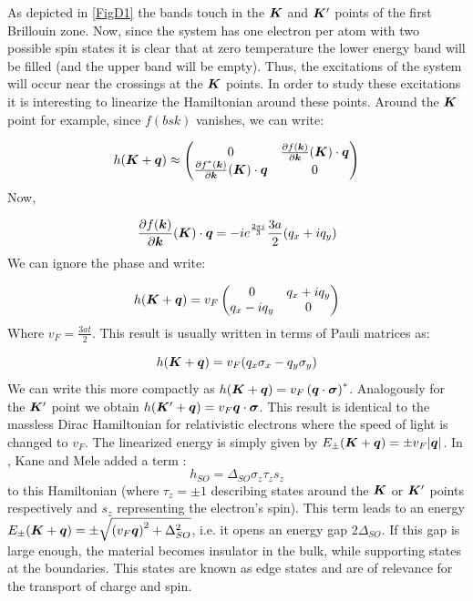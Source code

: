 As depicted in \ref{FigD1} the bands touch in the $\boldsymbol{K}$ and $\boldsymbol{K}'$ points of the first Brillouin zone. Now, since the system has one electron per atom with two possible spin states it is clear that at zero temperature the lower energy band will be filled (and the upper band will be empty). Thus, the excitations of the system will occur near the crossings at the $\boldsymbol{K}$ points. In order to study these excitations it is interesting to linearize the Hamiltonian around these points. Around the $\boldsymbol{K}$ point for example, since $f(bs{k})$ vanishes, we can write:

\begin{equation}
h(\boldsymbol{K}+\boldsymbol{q}) \approx \begin{pmatrix}
    0 & \frac{\partial f(\boldsymbol{k})}{\partial \boldsymbol{k}}(\boldsymbol{K})\cdot\boldsymbol{q} \\
    \frac{\partial f^*(\boldsymbol{k})}{\partial \boldsymbol{k}}(\boldsymbol{K})\cdot\boldsymbol{q} & 0
\end{pmatrix}
\end{equation}
Now, 

\begin{equation}
\frac{\partial f(\boldsymbol{k})}{\partial \boldsymbol{k}}(\boldsymbol{K})\cdot\boldsymbol{q} = -ie^{\frac{2\pi i}{3}} \frac{3a}{2}(q_x+iq_y)
\end{equation}
We can ignore the phase and write:

\begin{equation}
h(\boldsymbol{K}+\boldsymbol{q}) = v_F \begin{pmatrix}
    0 & q_x+iq_y \\
    q_x-iq_y & 0
\end{pmatrix}
\end{equation}
Where $v_F = \frac{3at}{2}$. This result is usually written in terms of Pauli matrices as:

\begin{equation}
h(\boldsymbol{K}+\boldsymbol{q}) = v_F(q_x\sigma_x-q_y\sigma_y)
\end{equation}
We can write this more compactly as $h(\boldsymbol{K}+\boldsymbol{q}) = v_F \left(\boldsymbol{q}\cdot\boldsymbol{\sigma}\right)^*$. Analogously for the $\boldsymbol{K}'$ point we obtain $h(\boldsymbol{K}'+\boldsymbol{q}) = v_F\boldsymbol{q}\cdot\boldsymbol{\sigma}$. This result is identical to the massless Dirac Hamiltonian for relativistic electrons where the speed of light is changed to $v_F$. The linearized energy is simply given by $E_{\pm}(\boldsymbol{K}+\boldsymbol{q}) = \pm v_F|\boldsymbol{q}|$. In \cite{Kane2005}, Kane and Mele added a term :
\begin{equation}
h_{SO} = \Delta_{SO}\sigma_z\tau_z s_z
\end{equation} 
to this Hamiltonian (where $\tau_z = \pm 1$ describing states around the $\boldsymbol{K}$ or $\boldsymbol{K}'$ points respectively and $s_z$ representing the electron's spin). This term leads to an energy $E_{\pm}(\boldsymbol{K}+\boldsymbol{q}) = \pm \sqrt{\left(v_F\boldsymbol{q} \right)^2 + \Delta_{SO}^2}$, i.e. it opens an energy gap $2\Delta_{SO}$. If this gap is large enough, the material becomes insulator in the bulk, while supporting states at the boundaries. This states are known as edge states and are of relevance for the transport of charge and spin.
